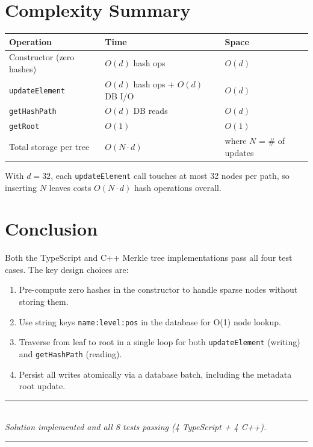 \documentclass[12pt,a4paper]{article}
\begin{document}
\section{Complexity Summary}

\begin{center}
\begin{tabular}{lll}
\toprule
\textbf{Operation} & \textbf{Time} & \textbf{Space} \\
\midrule
Constructor (zero hashes) & $O(d)$ hash ops & $O(d)$ \\
\texttt{updateElement} & $O(d)$ hash ops + $O(d)$ DB I/O & $O(d)$ \\
\texttt{getHashPath} & $O(d)$ DB reads & $O(d)$ \\
\texttt{getRoot} & $O(1)$ & $O(1)$ \\
\midrule
Total storage per tree & $O(N \cdot d)$ & where $N$ = \# of updates \\
\bottomrule
\end{tabular}
\end{center}

With $d = 32$, each \texttt{updateElement} call touches at most 32 nodes per
path, so inserting $N$ leaves costs $O(N \cdot d)$ hash operations overall.

\section{Conclusion}

Both the TypeScript and C++ Merkle tree implementations pass all four test
cases.  The key design choices are:
\begin{enumerate}
  \item Pre-compute zero hashes in the constructor to handle sparse nodes
        without storing them.
  \item Use string keys \texttt{name:level:pos} in the database for O(1)
        node lookup.
  \item Traverse from leaf to root in a single loop for both
        \texttt{updateElement} (writing) and \texttt{getHashPath} (reading).
  \item Persist all writes atomically via a database batch, including the
        metadata root update.
\end{enumerate}

\vspace{1cm}
\begin{center}
  {\color{aztecpurple}\rule{0.5\linewidth}{1pt}}\\[0.3cm]
  \textit{Solution implemented and all 8 tests passing (4 TypeScript + 4 C++).}\\[0.3cm]
  {\color{aztecpurple}\rule{0.5\linewidth}{1pt}}
\end{center}
\end{document}
